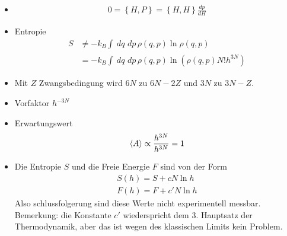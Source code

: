 \documentclass[11pt]{article}
\theoremstyle{plain}
\theoremstyle{mytheoremstyle}
\newcommand{\dd}[2]{\frac{d{#1}}{d{#2}}}
\renewcommand{\d}[1]{\,d#1\,}
\begin{document}
\begin{itemize}
  \item %
    \begin{align*}
      0 = \left\{ H,P \right\} = \left\{ H, H \right\} \dd{p}{H}
    \end{align*}
  \item Entropie 
    \begin{align*}
      S & \neq - k_B \int_{}^{} \d{q} \d{p} \rho(q,p) \ln{\rho(q,p)} \\
        & = -k_B \int_{}^{} \d{q} \d{p} \rho(q,p) \ln{\left( 
  \rho(q,p) N! h^{3N}\right)}
    \end{align*}
  \item Mit $Z$ Zwangsbedingung wird $6N$ zu $6N - 2Z$ und $3N$ zu $3N - Z$.
  \item Vorfaktor $h^{-3N}$
  \item Erwartungswert 
    \begin{align*}
      \Braket{A} \propto \frac{h^{3N}}{h^{3N}} = 1
    \end{align*}
  \item Die Entropie $S$ und die Freie Energie $F$ sind von der Form
    \begin{align*}
      S(h) = S + c N \ln{h} \\
      F(h) = F + c' N \ln{h}
    \end{align*}
    Also schlussfolgerung sind diese Werte nicht experimentell messbar.
    Bemerkung: die Konstante $c'$ wiederspricht dem 3. Hauptsatz der
    Thermodynamik, aber das ist wegen des klassischen Limits kein Problem.
\end{itemize}
\end{document}

